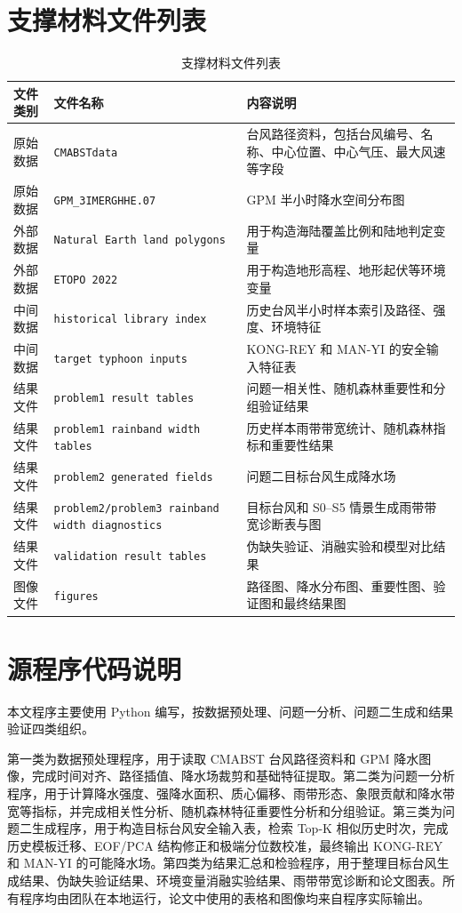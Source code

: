 \documentclass[UTF8,a4paper,zihao=5,fontset=fandol]{ctexart}
\numberwithin{equation}{section}
\numberwithin{figure}{section}
\numberwithin{table}{section}
\begin{document}
\section{支撑材料文件列表}
\begin{table}[H]
  \centering
  \caption{支撑材料文件列表}
  \begin{tabularx}{\linewidth}{lXX}
    \toprule
    文件类别 & 文件名称 & 内容说明 \\
    \midrule
    原始数据 & \texttt{CMABSTdata} & 台风路径资料，包括台风编号、名称、中心位置、中心气压、最大风速等字段 \\
    原始数据 & \texttt{GPM\_3IMERGHHE.07} & GPM 半小时降水空间分布图 \\
    外部数据 & \texttt{Natural Earth land polygons} & 用于构造海陆覆盖比例和陆地判定变量 \\
    外部数据 & \texttt{ETOPO 2022} & 用于构造地形高程、地形起伏等环境变量 \\
    中间数据 & \texttt{historical library index} & 历史台风半小时样本索引及路径、强度、环境特征 \\
    中间数据 & \texttt{target typhoon inputs} & KONG-REY 和 MAN-YI 的安全输入特征表 \\
    结果文件 & \texttt{problem1 result tables} & 问题一相关性、随机森林重要性和分组验证结果 \\
    结果文件 & \texttt{problem1 rainband width tables} & 历史样本雨带带宽统计、随机森林指标和重要性结果 \\
    结果文件 & \texttt{problem2 generated fields} & 问题二目标台风生成降水场 \\
    结果文件 & \texttt{problem2/problem3 rainband width diagnostics} & 目标台风和 S0--S5 情景生成雨带带宽诊断表与图 \\
    结果文件 & \texttt{validation result tables} & 伪缺失验证、消融实验和模型对比结果 \\
    图像文件 & \texttt{figures} & 路径图、降水分布图、重要性图、验证图和最终结果图 \\
    \bottomrule
  \end{tabularx}
\end{table}

\section{源程序代码说明}
本文程序主要使用 Python 编写，按数据预处理、问题一分析、问题二生成和结果验证四类组织。

第一类为数据预处理程序，用于读取 CMABST 台风路径资料和 GPM 降水图像，完成时间对齐、路径插值、降水场裁剪和基础特征提取。第二类为问题一分析程序，用于计算降水强度、强降水面积、质心偏移、雨带形态、象限贡献和降水带宽等指标，并完成相关性分析、随机森林特征重要性分析和分组验证。第三类为问题二生成程序，用于构造目标台风安全输入表，检索 Top-K 相似历史时次，完成历史模板迁移、EOF/PCA 结构修正和极端分位数校准，最终输出 KONG-REY 和 MAN-YI 的可能降水场。第四类为结果汇总和检验程序，用于整理目标台风生成结果、伪缺失验证结果、环境变量消融实验结果、雨带带宽诊断和论文图表。所有程序均由团队在本地运行，论文中使用的表格和图像均来自程序实际输出。
\end{document}
